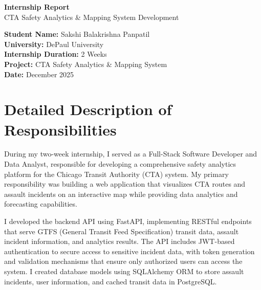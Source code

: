 \documentclass[12pt,letterpaper]{article}
\begin{document}
\begin{titlepage}
    \centering
    \vspace*{2cm}

    {\Huge\bfseries Internship Report\\}
    \vspace{0.5cm}
    {\LARGE CTA Safety Analytics \& Mapping System Development\\}
    \vspace{2cm}

    {\Large
    \textbf{Student Name:} Sakshi Balakrishna Panpatil\\
    \vspace{0.3cm}
    \textbf{University:} DePaul University\\
    \vspace{0.3cm}
    \textbf{Internship Duration:} 2 Weeks\\
    \vspace{0.3cm}
    \textbf{Project:} CTA Safety Analytics \& Mapping System\\
    \vspace{0.3cm}
    \textbf{Date:} December 2025\\
    }

    \vfill
\end{titlepage}

\tableofcontents
\newpage

\section{Detailed Description of Responsibilities}

During my two-week internship, I served as a Full-Stack Software Developer and Data Analyst, responsible for developing a comprehensive safety analytics platform for the Chicago Transit Authority (CTA) system. My primary responsibility was building a web application that visualizes CTA routes and assault incidents on an interactive map while providing data analytics and forecasting capabilities.

I developed the backend API using FastAPI, implementing RESTful endpoints that serve GTFS (General Transit Feed Specification) transit data, assault incident information, and analytics results. The API includes JWT-based authentication to secure access to sensitive incident data, with token generation and validation mechanisms that ensure only authorized users can access the system. I created database models using SQLAlchemy ORM to store assault incidents, user information, and cached transit data in PostgreSQL.
\end{document}
